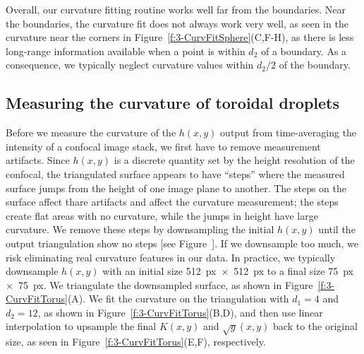 Overall, our curvature fitting routine works well far from the boundaries.
Near the boundaries, the curvature fit does not always work very well, as seen in the curvature near the corners in Figure~\ref{f:3-CurvFitSphere}(C,F-H), as there is less long-range information available when a point is within $d_2$ of a boundary.
As a consequence, we typically neglect curvature values within $d_2/2$ of the boundary.


\subsection{Measuring the curvature of toroidal droplets}
Before we measure the curvature of the $h(x,y)$ output from time-averaging the intensity of a confocal image stack, we first have to remove measurement artifacts.
Since $h(x,y)$ is a discrete quantity set by the height resolution of the confocal, the triangulated surface appears to have ``steps'' where the measured surface jumps from the height of one image plane to another.
The steps on the surface affect thare artifacts and affect the curvature measurement; the steps create flat areas with no curvature, while the jumps in height have large curvature.
We remove these steps by downsampling the initial $h(x,y)$ until the output triangulation show no steps [see Figure~].
If we downsample too much, we risk eliminating real curvature features in our data.
In practice, we typically downsample $h(x,y)$ with an initial size 512~px~$\times$~512~px to a final size 75~px~$\times$~75~px.
We triangulate the downsampled surface, as shown in Figure~\ref{f:3-CurvFitTorus}(A).
We fit the curvature on the triangulation with $d_1 = 4$ and $d_2 = 12$, as shown in Figure~\ref{f:3-CurvFitTorus}(B,D), and then use linear interpolation to upsample the final $K(x,y)$ and $\sqrt{g}(x,y)$ back to the original size, as seen in Figure~\ref{f:3-CurvFitTorus}(E,F), respectively.
